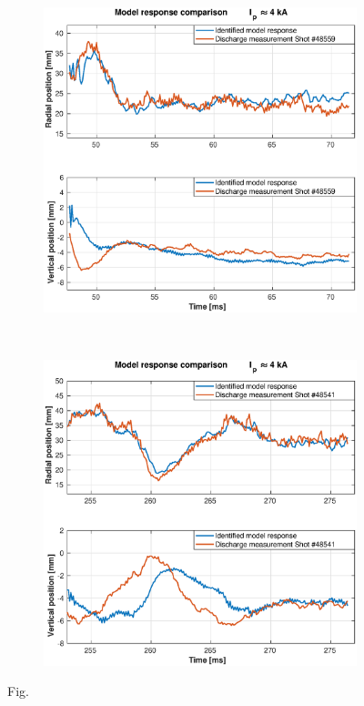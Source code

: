 \begin{figure}
	\begin{subfigure}[b]{0.55\textwidth}
		\includegraphics[width=\textwidth]{Chp5/SimResp_559.eps}  
		\caption{\label{SimResp559} }
	\end{subfigure}
	~ %
	\begin{subfigure}[b]{0.55\textwidth}
		\includegraphics[width=\textwidth]{Chp5/SimResp_541.eps}        
		\caption{\label{SimResp541}}
	\end{subfigure}
	\caption{Fig. }
\end{figure}

